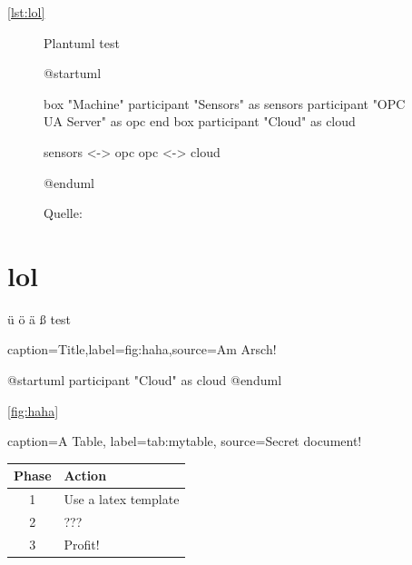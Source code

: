 \documentclass[%
    debug           = true,
    auto-generate   = true,
    print-ndn       = true,
    plantuml        = true
]{udhbwvst}
\begin{document}


\autoref{lst:lol}

\blindtext

\begin{figure}[h]
    \centering
    \caption{Plantuml test}
    \begin{plantuml}
        @startuml

        box "Machine"
            participant "Sensors" as sensors
            participant "OPC UA Server" as opc
        end box
        participant "Cloud" as cloud

        sensors <-> opc
        opc <-> cloud

        @enduml    
    \end{plantuml}
    \caption*{\footnotesize{Quelle: }}
    \label{fig:plantuml_test}
\end{figure}

\section{lol}

ü ö ä ß test

\lipsum

\begin{dhbwfigure}{caption=Title,label=fig:haha,source={Am Arsch!}}
    \begin{plantuml}
        @startuml
        participant "Cloud" as cloud
        @enduml            
    \end{plantuml}
\end{dhbwfigure}

\autoref{fig:haha}

\lipsum

\begin{dhbwtable}{%
    caption={A Table},
    label=tab:mytable,
    source={Secret document!}
}
    \begin{tabular}{ | c | l |}
        \hline
        \textbf{Phase}  & \textbf{Action}       \\ \hline
        1               & Use a latex template  \\ \hline
        2               & ???                   \\ \hline
        3               & Profit!               \\ \hline
    \end{tabular}
\end{dhbwtable}
\end{document}
